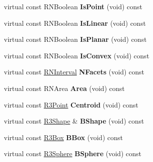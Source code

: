 \begin{DoxyCompactItemize}
\item 
virtual const R\+N\+Boolean {\bfseries Is\+Point} (void) const \hypertarget{class_r3_ellipse_a7ab39e725683da3dd47028f608762b2d}{}\label{class_r3_ellipse_a7ab39e725683da3dd47028f608762b2d}

\item 
virtual const R\+N\+Boolean {\bfseries Is\+Linear} (void) const \hypertarget{class_r3_ellipse_a058964b90e84e8509863e2c55d72786f}{}\label{class_r3_ellipse_a058964b90e84e8509863e2c55d72786f}

\item 
virtual const R\+N\+Boolean {\bfseries Is\+Planar} (void) const \hypertarget{class_r3_ellipse_a8f603317f1793654f4bf072ef9d7822c}{}\label{class_r3_ellipse_a8f603317f1793654f4bf072ef9d7822c}

\item 
virtual const R\+N\+Boolean {\bfseries Is\+Convex} (void) const \hypertarget{class_r3_ellipse_af44ed227c06af897fd63861c558163cf}{}\label{class_r3_ellipse_af44ed227c06af897fd63861c558163cf}

\item 
virtual const \hyperlink{class_r_n_interval}{R\+N\+Interval} {\bfseries N\+Facets} (void) const \hypertarget{class_r3_ellipse_a149dc39dbcf239ef8bdc131245fcd6bb}{}\label{class_r3_ellipse_a149dc39dbcf239ef8bdc131245fcd6bb}

\item 
virtual const R\+N\+Area {\bfseries Area} (void) const \hypertarget{class_r3_ellipse_a9b80af9e9f6f2f4c3bc4a4546865fd63}{}\label{class_r3_ellipse_a9b80af9e9f6f2f4c3bc4a4546865fd63}

\item 
virtual const \hyperlink{class_r3_point}{R3\+Point} {\bfseries Centroid} (void) const \hypertarget{class_r3_ellipse_a971f3eee289e4c8368385389caa66fd2}{}\label{class_r3_ellipse_a971f3eee289e4c8368385389caa66fd2}

\item 
virtual const \hyperlink{class_r3_shape}{R3\+Shape} \& {\bfseries B\+Shape} (void) const \hypertarget{class_r3_ellipse_af8e1c0624f2896afa7aca0325e4814fa}{}\label{class_r3_ellipse_af8e1c0624f2896afa7aca0325e4814fa}

\item 
virtual const \hyperlink{class_r3_box}{R3\+Box} {\bfseries B\+Box} (void) const \hypertarget{class_r3_ellipse_a87b2311cab38a65840f4de230992e274}{}\label{class_r3_ellipse_a87b2311cab38a65840f4de230992e274}

\item 
virtual const \hyperlink{class_r3_sphere}{R3\+Sphere} {\bfseries B\+Sphere} (void) const \hypertarget{class_r3_ellipse_a907acd1e0d751bf830ac5c5450ff3631}{}\label{class_r3_ellipse_a907acd1e0d751bf830ac5c5450ff3631}


\end{DoxyCompactItemize}
